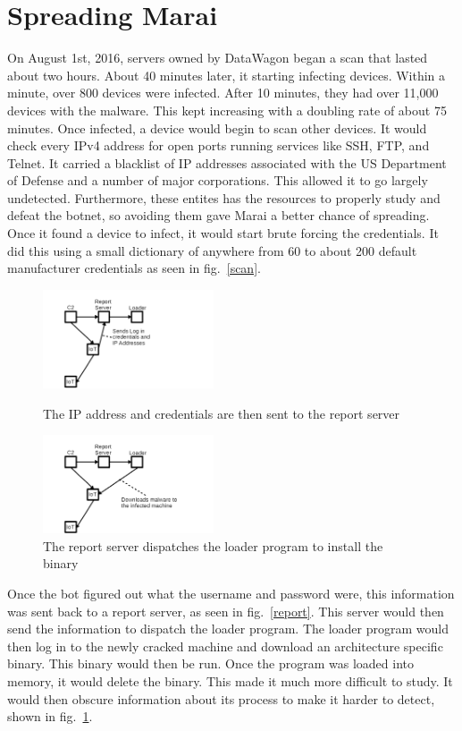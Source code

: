 \documentclass[conference]{IEEEtran}
\begin{document}
\section{Spreading Marai}
On August 1st, 2016, servers owned by DataWagon began a scan that lasted about two hours. About 40 minutes later, it starting infecting devices. Within a minute, over 800 devices were infected. After 10 minutes, they had over 11,000 devices with the malware. This kept increasing with a doubling rate of about 75 minutes. Once infected, a device would begin to scan other devices. It would check every IPv4 address for open ports running services like SSH, FTP, and Telnet. It carried a blacklist of IP addresses associated with the US Department of Defense and a number of major corporations. This allowed it to go largely undetected. Furthermore, these entites has the resources to properly study and defeat the botnet, so avoiding them gave Marai a better chance of spreading. Once it found a device to infect, it would start brute forcing the credentials. It did this using a small dictionary of anywhere from 60 to about 200 default manufacturer credentials as seen in fig.~\ref{scan}. 

 \begin{figure}[t]
\centerline{\includegraphics[width=0.45\textwidth]{../fig2.png}}
\caption{The IP address and credentials are then sent to the report server}
\label{report}
\centerline{\includegraphics[width=0.45\textwidth]{../fig3.png}}
\caption{The report server dispatches the loader program to install the binary}
\label{loader}
\end{figure}

Once the bot figured out what the username and password were, this information was sent back to a report server, as seen in fig.~\ref{report}. This server would then send the information to dispatch the loader program. The loader program would then log in to the newly cracked machine and download an architecture specific binary. This binary would then be run. Once the program was loaded into memory, it would delete the binary. This made it much more difficult to study. It would then obscure information about its process to make it harder to detect, shown in fig.~\ref{loader}.
\end{document}
